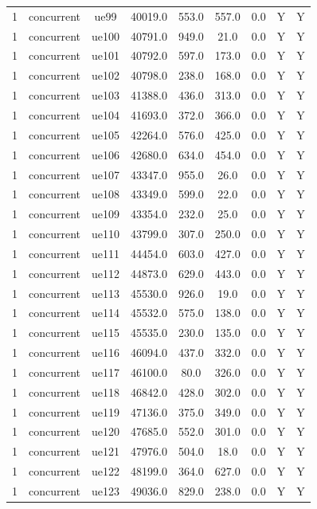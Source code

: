 \begin{table}[ht]
\begin{tabular}{|c|c|c|c|c|c|c|c|c|}
1 & concurrent & ue99 & 40019.0 & 553.0 & 557.0 & 0.0 & Y & Y \\
1 & concurrent & ue100 & 40791.0 & 949.0 & 21.0 & 0.0 & Y & Y \\
1 & concurrent & ue101 & 40792.0 & 597.0 & 173.0 & 0.0 & Y & Y \\
1 & concurrent & ue102 & 40798.0 & 238.0 & 168.0 & 0.0 & Y & Y \\
1 & concurrent & ue103 & 41388.0 & 436.0 & 313.0 & 0.0 & Y & Y \\
1 & concurrent & ue104 & 41693.0 & 372.0 & 366.0 & 0.0 & Y & Y \\
1 & concurrent & ue105 & 42264.0 & 576.0 & 425.0 & 0.0 & Y & Y \\
1 & concurrent & ue106 & 42680.0 & 634.0 & 454.0 & 0.0 & Y & Y \\
1 & concurrent & ue107 & 43347.0 & 955.0 & 26.0 & 0.0 & Y & Y \\
1 & concurrent & ue108 & 43349.0 & 599.0 & 22.0 & 0.0 & Y & Y \\
1 & concurrent & ue109 & 43354.0 & 232.0 & 25.0 & 0.0 & Y & Y \\
1 & concurrent & ue110 & 43799.0 & 307.0 & 250.0 & 0.0 & Y & Y \\
1 & concurrent & ue111 & 44454.0 & 603.0 & 427.0 & 0.0 & Y & Y \\
1 & concurrent & ue112 & 44873.0 & 629.0 & 443.0 & 0.0 & Y & Y \\
1 & concurrent & ue113 & 45530.0 & 926.0 & 19.0 & 0.0 & Y & Y \\
1 & concurrent & ue114 & 45532.0 & 575.0 & 138.0 & 0.0 & Y & Y \\
1 & concurrent & ue115 & 45535.0 & 230.0 & 135.0 & 0.0 & Y & Y \\
1 & concurrent & ue116 & 46094.0 & 437.0 & 332.0 & 0.0 & Y & Y \\
1 & concurrent & ue117 & 46100.0 & 80.0 & 326.0 & 0.0 & Y & Y \\
1 & concurrent & ue118 & 46842.0 & 428.0 & 302.0 & 0.0 & Y & Y \\
1 & concurrent & ue119 & 47136.0 & 375.0 & 349.0 & 0.0 & Y & Y \\
1 & concurrent & ue120 & 47685.0 & 552.0 & 301.0 & 0.0 & Y & Y \\
1 & concurrent & ue121 & 47976.0 & 504.0 & 18.0 & 0.0 & Y & Y \\
1 & concurrent & ue122 & 48199.0 & 364.0 & 627.0 & 0.0 & Y & Y \\
1 & concurrent & ue123 & 49036.0 & 829.0 & 238.0 & 0.0 & Y & Y \\

\end{tabular}
\end{table}
